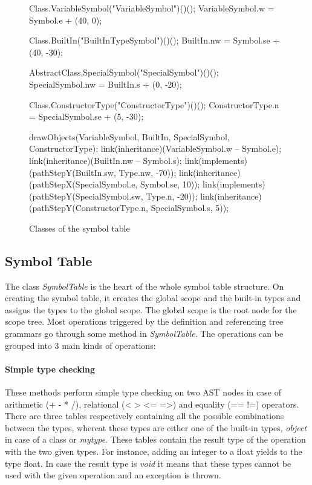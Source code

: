 \begin{figure}[H]
\begin{emp}[classdiag]
	Class.VariableSymbol("VariableSymbol")()();
	VariableSymbol.w = Symbol.e + (40, 0);

	Class.BuiltIn("BuiltInTypeSymbol")()();
	BuiltIn.nw = Symbol.se + (40, -30);

	AbstractClass.SpecialSymbol("SpecialSymbol")()();
	SpecialSymbol.nw = BuiltIn.s + (0, -20);

	Class.ConstructorType("ConstructorType")()();
	ConstructorType.n = SpecialSymbol.se + (5, -30);

	drawObjects(VariableSymbol, BuiltIn, SpecialSymbol, ConstructorType);
	link(inheritance)(VariableSymbol.w -- Symbol.e);
	link(inheritance)(BuiltIn.nw -- Symbol.s);
	link(implements)(pathStepY(BuiltIn.sw, Type.nw, -70));
	link(inheritance)(pathStepX(SpecialSymbol.e, Symbol.se, 10));
	link(implements)(pathStepY(SpecialSymbol.sw, Type.n, -20));
	link(inheritance)(pathStepY(ConstructorType.n, SpecialSymbol.s, 5));

	\end{emp}
	\caption{Classes of the symbol table}
	\label{fig:classes}
\end{figure}

\subsection{Symbol Table}
\label{sec:symbolTableDescription}

The class \emph{SymbolTable} is the heart of the whole symbol table structure. 
On creating the symbol table, it creates the global scope and the built-in 
types and assigns the types to the global scope. The global scope is the root 
node for the scope tree.  Most operations triggered by the definition and
referencing tree grammars go through some method in \emph{SymbolTable}. 
The operations can be grouped into 3 main kinds of operations:

\paragraph{Simple type checking}
These methods perform simple type checking on two AST nodes in case of
arithmetic (+ - * /), relational (< > <= =>) and equality (== !=) operators. 
There are three tables respectively containing all the possible combinations 
between the types, whereat these types are either one of the built-in types, 
\emph{object} in case of a class or \emph{mytype}. These tables contain the 
result type of the operation with the two given types. For instance, adding
an integer to a float yields to the type float. In case the result type
is \emph{void} it means that these types cannot be used with the given 
operation and an exception is thrown.

